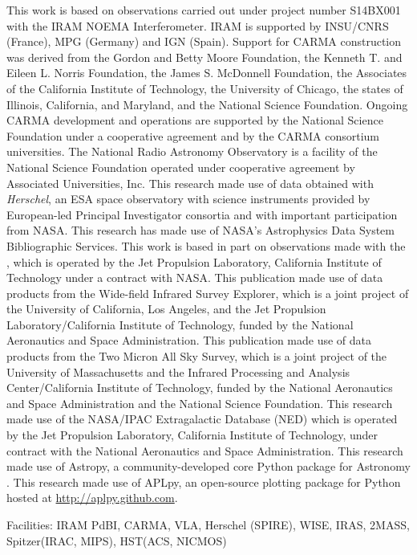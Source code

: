 \documentclass[]{emulateapj}
\begin{document}


\acknowledgments
This work is based on observations carried out under project number S14BX001
with the IRAM NOEMA Interferometer. IRAM is supported by INSU/CNRS (France), MPG (Germany) and IGN (Spain).
Support for CARMA construction was derived from the Gordon and Betty Moore
Foundation, the Kenneth T. and Eileen L. Norris Foundation, the James S.
McDonnell Foundation, the Associates of the California Institute of
Technology, the University of Chicago, the states of Illinois, California, and
Maryland, and the National Science Foundation. Ongoing CARMA development and
operations are supported by the National Science Foundation under a
cooperative agreement and by the CARMA consortium universities.
The National Radio Astronomy Observatory is a facility of the National Science
Foundation operated under cooperative agreement by Associated
Universities, Inc.
This research made use of data obtained with {\it Herschel}, an ESA space
observatory with science instruments provided by European-led Principal
Investigator consortia and with important participation from NASA.
This research has made use of NASA's Astrophysics Data System Bibliographic
Services.
This work is based in part on observations made with the \spitzer,
which is operated by the Jet Propulsion Laboratory, California Institute of
Technology under a contract with NASA.
This publication made use of data products from the Wide-field Infrared
Survey Explorer, which is a joint project of the University of California, Los
Angeles, and the Jet Propulsion Laboratory/California Institute of Technology,
funded by the National Aeronautics and Space Administration.
This publication made use of data products from the Two Micron All Sky
Survey, which is a joint project of the University of Massachusetts and the
Infrared Processing and Analysis Center/California Institute of Technology,
funded by the National Aeronautics and Space Administration and the National
Science Foundation.
This research made use of the NASA/IPAC Extragalactic Database (NED) which
is operated by the Jet Propulsion Laboratory, California Institute of
Technology, under contract with the National Aeronautics and Space
Administration.
This research made use of Astropy, a community-developed core Python package for Astronomy \citep{astropy}.
This research made use of APLpy, an open-source plotting package for Python hosted at \url{http://aplpy.github.com}.

Facilities: IRAM PdBI, CARMA, VLA, Herschel (SPIRE), WISE, IRAS, 2MASS, Spitzer(IRAC, MIPS), HST(ACS, NICMOS)




\end{document}
